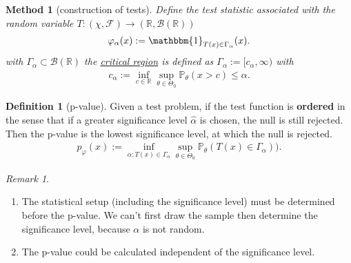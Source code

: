\documentclass[a4paper,12pt, oneside, fleqn]{book}
\newtheorem{method}[theorem]{Method}
\theoremstyle{definition}
\newtheorem{definition}{Definition}[section]
\theoremstyle{remark}
\newtheorem*{remark}{Remark}
\begin{document}
\begin{method}[construction of tests]
Define the test statistic associated with the random variable $T: (\chi, \mathcal{F}) \rightarrow (\mathbb{R}, \mathcal{B}(\mathbb{R})) $
\begin{align*}
	\varphi_\alpha (x) := \mathbbm{1}_{T(x) \in \Gamma_\alpha}(x). 
\end{align*}
with $\Gamma_\alpha \subset \mathcal{B}(\mathbb{R})$ the \underline{critical region} is defined as $\Gamma_\alpha:= [c_\alpha, \infty)$ with 
\begin{align*}
	c_\alpha:= \inf_{c \in \mathbb{R}} \sup_{\theta \in \Theta_0} \mathbb{P}_\theta( x > c) \le \alpha. 
\end{align*}
\end{method}

\begin{definition}[p-value]
Given a test problem, if the test function is \textbf{ordered} in the sense that if a greater significance level $\hat{\alpha}$ is chosen, the null is still rejected. Then the p-value is the lowest significance level, at which the null is rejected.
\begin{align*}
	p_\varphi(x):= \inf_{\alpha: T(x) \in \Gamma_\alpha} \sup_{\theta \in \Theta_0} \mathbb{P}_\theta(T(x) \in \Gamma_\alpha)).
\end{align*}
\end{definition}
\begin{remark}
\quad
\begin{enumerate}
    \item The statistical setup (including the significance level) must be determined before the p-value. We can't first draw the sample then determine the significance level, because $\alpha$ is not random. 
    \item The p-value could be calculated independent of the significance level.
\end{enumerate}
\end{remark}
\end{document}
